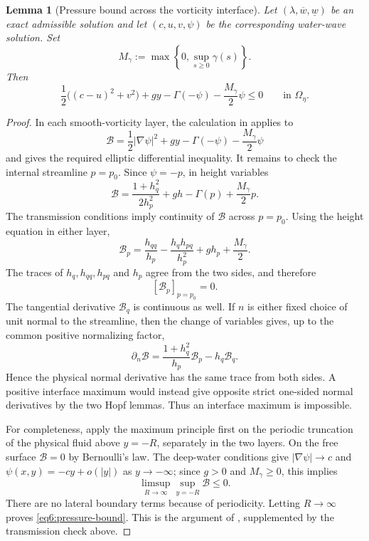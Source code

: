 \documentclass[11pt,reqno]{amsart}
\numberwithin{equation}{section}
\newtheorem{lemma}[theorem]{Lemma}
\theoremstyle{definition}
\theoremstyle{remark}
\begin{document}
\begin{lemma}[Pressure bound across the vorticity interface]
\label{lem6:pressure}
Let $(\lambda,\overline w,\underline w)$ be an exact admissible
solution and let $(c,u,v,\psi)$ be the corresponding water-wave
solution.  Set
\[
 M_\gamma:=\max\left\{0,\sup_{s\ge0}\gamma(s)\right\}.
\]
Then
\begin{equation}\label{eq6:pressure-bound}
 \frac12\bigl((c-u)^2+v^2\bigr)+gy-\Gamma(-\psi)
 -\frac{M_\gamma}{2}\psi\le0
 \qquad\text{in }\Omega_\eta.
\end{equation}
\end{lemma}
\begin{proof}
In each smooth-vorticity layer, the calculation in
\cite[Lemma 5.2]{Hur11} applies to
\[
 \mathscr B=
 \frac12|\nabla\psi|^2+gy-\Gamma(-\psi)
 -\frac{M_\gamma}{2}\psi
\]
and gives the required elliptic differential inequality.  It remains
to check the internal streamline $p=p_0$.  Since $\psi=-p$, in height
variables
\[
 \mathscr B=
 \frac{1+h_q^2}{2h_p^2}+gh-\Gamma(p)
 +\frac{M_\gamma}{2}p.
\]
The transmission conditions imply continuity of $\mathscr B$ across
$p=p_0$.  Using the height equation in either layer,
\[
 \mathscr B_p=
 \frac{h_{qq}}{h_p}
 -\frac{h_qh_{pq}}{h_p^2}
 +gh_p+\frac{M_\gamma}{2}.
\]
The traces of $h_q,h_{qq},h_{pq}$ and $h_p$ agree from the two sides,
and therefore
\[
 [\mathscr B_p]_{p=p_0}=0.
\]
The tangential derivative $\mathscr B_q$ is continuous as well.
If $n$ is either fixed choice of unit normal to the streamline, then
the change of variables gives, up to the common positive normalizing
factor,
\[
 \partial_n\mathscr B
 =\frac{1+h_q^2}{h_p}\mathscr B_p-h_q\mathscr B_q.
\]
Hence the physical normal derivative has the same trace from both
sides.  A positive interface maximum would instead give opposite
strict one-sided normal derivatives by the two Hopf lemmas.  Thus an
interface maximum is impossible.

For completeness, apply the maximum principle first on the periodic
truncation of the physical fluid above $y=-R$, separately in the two
layers.  On the free surface $\mathscr B=0$ by Bernoulli's law.  The
deep-water conditions give $|\nabla\psi|\to c$ and
$\psi(x,y)=-cy+o(|y|)$ as $y\to-\infty$; since $g>0$ and
$M_\gamma\ge0$, this implies
\[
 \limsup_{R\to\infty}\sup_{y=-R}\mathscr B\le0.
\]
There are no lateral boundary terms because of periodicity.  Letting
$R\to\infty$ proves \eqref{eq6:pressure-bound}.  This is the argument
of \cite[Lemma 5.2]{Hur11}, supplemented by the transmission check
above.
\end{proof}
\end{document}
